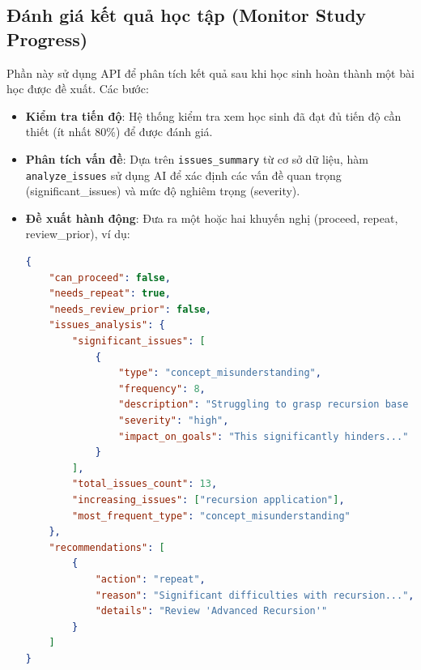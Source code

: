 \subsection{Đánh giá kết quả học tập (Monitor Study Progress)}
Phần này sử dụng API để phân tích kết quả sau khi học sinh hoàn thành một bài học được đề xuất. Các bước:
\begin{itemize}
    \item \textbf{Kiểm tra tiến độ}: Hệ thống kiểm tra xem học sinh đã đạt đủ tiến độ cần thiết (ít nhất 80\%) để được đánh giá.
    \item \textbf{Phân tích vấn đề}: Dựa trên \texttt{issues\_summary} từ cơ sở dữ liệu, hàm \texttt{analyze\_issues} sử dụng AI để xác định các vấn đề quan trọng (significant\_issues) và mức độ nghiêm trọng (severity).
    \item \textbf{Đề xuất hành động}: Đưa ra một hoặc hai khuyến nghị (proceed, repeat, review\_prior), ví dụ:
    \begin{lstlisting}[language=JSON]
{
    "can_proceed": false,
    "needs_repeat": true,
    "needs_review_prior": false,
    "issues_analysis": {
        "significant_issues": [
            {
                "type": "concept_misunderstanding",
                "frequency": 8,
                "description": "Struggling to grasp recursion base cases.",
                "severity": "high",
                "impact_on_goals": "This significantly hinders..."
            }
        ],
        "total_issues_count": 13,
        "increasing_issues": ["recursion application"],
        "most_frequent_type": "concept_misunderstanding"
    },
    "recommendations": [
        {
            "action": "repeat",
            "reason": "Significant difficulties with recursion...",
            "details": "Review 'Advanced Recursion'"
        }
    ]
}
    \end{lstlisting}
\end{itemize}


